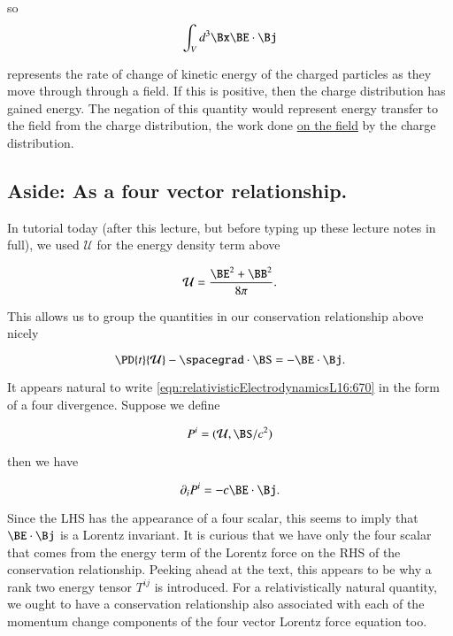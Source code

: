 so
\begin{equation}\label{eqn:relativisticElectrodynamicsL16:860}
\int_V d^3 \Bx \BE \cdot \Bj
\end{equation}

represents the rate of change of kinetic energy of the charged particles as they move through through a field.  If this is positive, then the charge distribution has gained energy.  The negation of this quantity would represent energy transfer to the field from the charge distribution, the work done \underline{on the field} by the charge distribution.

\subsection{Aside: As a four vector relationship.}

In tutorial today (after this lecture, but before typing up these lecture notes in full), we used $\mathcal{U}$ for the energy density term above

\begin{equation}\label{eqn:relativisticElectrodynamicsL16:650b}
\mathcal{U} = \frac{ \BE^2 + \BB^2 }{8 \pi} .
\end{equation}

This allows us to group the quantities in our conservation relationship above nicely

\begin{equation}\label{eqn:relativisticElectrodynamicsL16:670}
\PD{t}{\mathcal{U}} - \spacegrad \cdot \BS = - \BE \cdot \Bj.
\end{equation}

It appears natural to write \ref{eqn:relativisticElectrodynamicsL16:670} in the form of a four divergence.  Suppose we define

\begin{equation}\label{eqn:relativisticElectrodynamicsL16:710}
P^i = (\mathcal{U}, \BS/c^2)
\end{equation}

then we have

\begin{equation}\label{eqn:relativisticElectrodynamicsL16:730}
\partial_i P^i = - c \BE \cdot \Bj.
\end{equation}

Since the LHS has the appearance of a four scalar, this seems to imply that $\BE \cdot \Bj$ is a Lorentz invariant.  It is curious that we have only the four scalar that comes from the energy term of the Lorentz force on the RHS of the conservation relationship.  Peeking ahead at the text, this appears to be why a rank two energy tensor $T^{ij}$ is introduced.  For a relativistically natural quantity, we ought to have a conservation relationship also associated with each of the momentum change components of the four vector Lorentz force equation too.

\EndArticle
